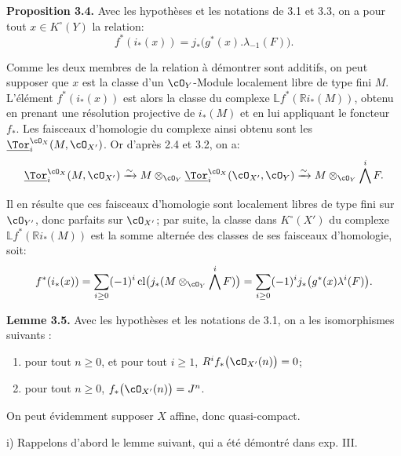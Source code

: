 \textbf{Proposition 3.4.} Avec les hypothèses et les notations de 3.1 et 3.3, on a pour tout \(x\in K^\circ(Y)\) la relation:
\[
f^*(i_*(x))=j_*\bigl(g^*(x).\lambda_{-1}(F)\bigr).
\]

Comme les deux membres de la relation à démontrer sont additifs, on peut supposer que \(x\) est la classe d'un \(\cO_Y\)-Module localement libre de type fini \(M\). L'élément \(f^*(i_*(x))\) est alors la classe du complexe \(\mathbb Lf^*(\mathbb Ri_*(M))\), obtenu en prenant une résolution projective de \(i_*(M)\) et en lui appliquant le foncteur \(f_*\). Les faisceaux d'homologie du complexe ainsi obtenu sont les \(\underline{\Tor}_i^{\cO_X}(M,\cO_{X'})\). Or d'après 2.4 et 3.2, on a:
\[
\underline{\Tor}_i^{\cO_X}(M,\cO_{X'})
\xrightarrow{\sim}
M\otimes_{\cO_Y}\underline{\Tor}_i^{\cO_X}(\cO_{X'},\cO_Y)
\xrightarrow{\sim}
M\otimes_{\cO_Y}\bigwedge^iF.
\]

Il en résulte que ces faisceaux d'homologie sont localement libres de type fini sur \(\cO_{Y'}\), donc parfaits sur \(\cO_{X'}\); par suite, la classe dans \(K^\circ(X')\) du complexe \(\mathbb Lf^*(\mathbb Ri_*(M))\) est la somme alternée des classes de ses faisceaux d'homologie, soit:
\[
f^*(i_*(x))
=\sum_{i\ge0}(-1)^i\operatorname{cl}
\bigl(j_*(M\otimes_{\cO_Y}\bigwedge^iF)\bigr)
=\sum_{i\ge0}(-1)^i
j_*\bigl(g^*(x)\lambda^i(F)\bigr).
\]

\textbf{Lemme 3.5.} Avec les hypothèses et les notations de 3.1, on a les isomorphismes suivants :
\begin{enumerate}[label=\roman*)]
\item pour tout \(n\ge0\), et pour tout \(i\ge1\), \(R^if_*\bigl(\cO_{X'}(n)\bigr)=0\);
\item pour tout \(n\ge0\), \(f_*\bigl(\cO_{X'}(n)\bigr)=J^n\).
\end{enumerate}

On peut évidemment supposer \(X\) affine, donc quasi-compact.

i) Rappelons d'abord le lemme suivant, qui a été démontré dans exp. III.

